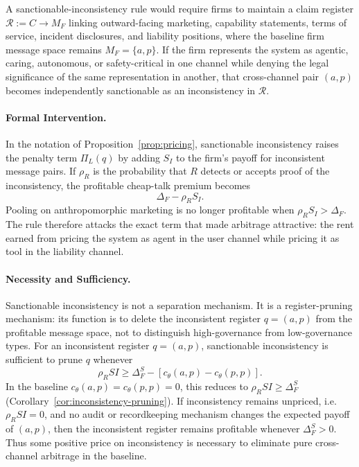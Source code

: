 \documentclass[preprint,authoryear]{elsarticle}
\theoremstyle{definition}
\theoremstyle{plain}
\begin{document}
A sanctionable-inconsistency rule would require firms to maintain
a claim register $\mathcal{R} := C \to M_F$ linking outward-facing
marketing, capability statements, terms of service, incident disclosures, and
liability positions, where the baseline firm message space remains
$M_F=\{a,p\}$. If the firm represents the system as agentic, caring, autonomous,
or safety-critical in one channel while denying the legal significance of the
same representation in another, that cross-channel pair $(a,p)$ becomes
independently sanctionable as an inconsistency in $\mathcal{R}$.

\paragraph{Formal Intervention.}
In the notation of Proposition~\ref{prop:pricing}, sanctionable inconsistency
raises the penalty term $\Pi_L(q)$ by adding $S_I$ to the firm's payoff for
inconsistent message pairs.  If $\rho_R$ is the probability that $R$ detects or
accepts proof of the inconsistency, the profitable cheap-talk premium becomes
\[
\Delta_F-\rho_R S_I .
\]
Pooling on anthropomorphic marketing is no longer profitable when
$\rho_R S_I>\Delta_F$.  The rule therefore attacks the exact term that made
arbitrage attractive: the rent earned from pricing the system as agent in the
user channel while pricing it as tool in the liability channel.

\paragraph{Necessity and Sufficiency.}
Sanctionable inconsistency is not a separation mechanism.  It is a
register-pruning mechanism: its function is to delete the inconsistent
register $q=(a,p)$ from the profitable message space, not to distinguish
high-governance from low-governance types.
For an inconsistent register $q=(a,p)$, sanctionable inconsistency is
sufficient to prune $q$ whenever
\[
\rho_R SI \ge \Delta_F^S - [c_\theta(a,p)-c_\theta(p,p)].
\]
In the baseline $c_\theta(a,p)=c_\theta(p,p)=0$, this reduces to
$\rho_R SI \ge \Delta_F^S$
(Corollary~\ref{cor:inconsistency-pruning}).
If inconsistency remains unpriced, i.e.\ $\rho_R SI=0$, and no audit or
recordkeeping mechanism changes the expected payoff of $(a,p)$, then the
inconsistent register remains profitable whenever $\Delta_F^S>0$.
Thus some positive price on inconsistency is necessary to eliminate pure
cross-channel arbitrage in the baseline.
\end{document}
